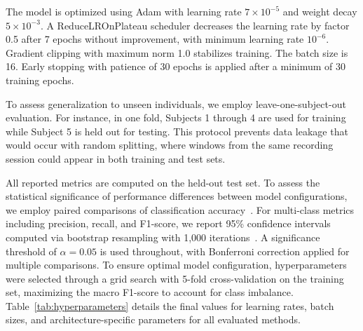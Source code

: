 \documentclass[pdflatex,sn-vancouver-num, iicol]{sn-jnl}
\begin{document}
The model is optimized using Adam with learning rate $7 \times 10^{-5}$ and weight decay $5 \times 10^{-3}$. A ReduceLROnPlateau scheduler decreases the learning rate by factor 0.5 after 7 epochs without improvement, with minimum learning rate $10^{-6}$. Gradient clipping with maximum norm 1.0 stabilizes training. The batch size is 16. Early stopping with patience of 30 epochs is applied after a minimum of 30 training epochs.


To assess generalization to unseen individuals, we employ leave-one-subject-out evaluation. For instance, in one fold, Subjects 1 through 4 are used for training while Subject 5 is held out for testing. This protocol prevents data leakage that would occur with random splitting, where windows from the same recording session could appear in both training and test sets.

All reported metrics are computed on the held-out test set. To assess the statistical significance of performance differences between model configurations, we employ paired comparisons of classification accuracy~\cite{demsar2006statistical}. For multi-class metrics including precision, recall, and F1-score, we report 95\% confidence intervals computed via bootstrap resampling with 1,000 iterations~\cite{lehmann2006testing}. A significance threshold of $\alpha = 0.05$ is used throughout, with Bonferroni correction applied for multiple comparisons. 
To ensure optimal model configuration, hyperparameters were selected through a grid search with 5-fold cross-validation on the training set, maximizing the macro F1-score to account for class imbalance.
Table~\ref{tab:hyperparameters} details the final values for learning rates, batch sizes, and architecture-specific parameters for all evaluated methods.
\end{document}
